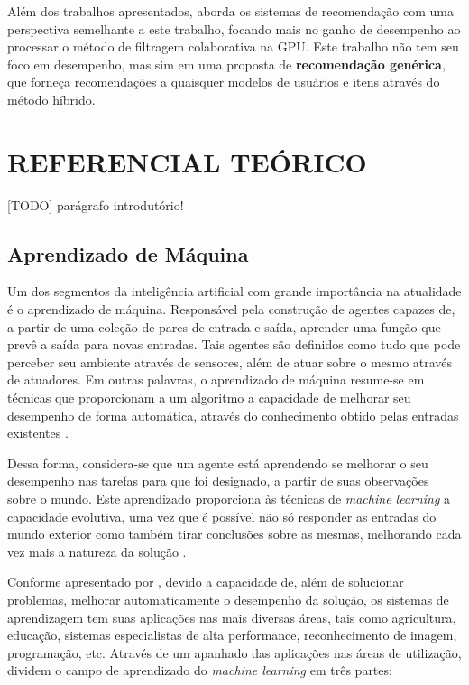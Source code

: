 \documentclass[12pt, openright, oneside, a4paper, brazil]{abntex2}
\begin{document}
Além dos trabalhos apresentados,  aborda os sistemas de recomendação com uma perspectiva semelhante a este trabalho, focando mais no ganho de desempenho ao processar o método de filtragem colaborativa na GPU. Este trabalho não tem seu foco em desempenho, mas sim em uma proposta de \textbf{recomendação genérica}, que forneça recomendações a quaisquer modelos de usuários e itens através do método híbrido.

%
%

\cleardoublepage

\chapter{REFERENCIAL TEÓRICO}

[TODO] parágrafo introdutório!

\section{Aprendizado de Máquina}

Um dos segmentos da inteligência artificial com grande importância na atualidade é o aprendizado de máquina. Responsável pela construção de agentes capazes de, a partir de uma coleção de pares de entrada e saída, aprender uma função que prevê a saída para novas entradas. Tais agentes são definidos como tudo que pode perceber seu ambiente através de sensores, além de atuar sobre o mesmo através de atuadores. Em outras palavras, o aprendizado de máquina resume-se em técnicas que proporcionam a um algoritmo a capacidade de melhorar seu desempenho de forma automática, através do conhecimento obtido pelas entradas existentes \cite{coppin2015inteligencia}.

Dessa forma, considera-se que um agente está aprendendo se melhorar o seu desempenho nas tarefas para que foi designado, a partir de suas observações sobre o mundo. Este aprendizado proporciona às técnicas de \textit{machine learning} a capacidade evolutiva, uma vez que é possível não só responder as entradas do mundo exterior como também tirar conclusões sobre as mesmas, melhorando cada vez mais a natureza da solução \cite{russell2004inteligencia}.

Conforme apresentado por , devido a capacidade de, além de solucionar problemas, melhorar automaticamente o desempenho da solução, os sistemas de aprendizagem tem suas aplicações nas mais diversas áreas, tais como agricultura, educação, sistemas especialistas de alta performance, reconhecimento de imagem, programação, etc. Através de um apanhado das aplicações nas áreas de utilização,  dividem o campo de aprendizado do \textit{machine learning} em três partes:
\end{document}
